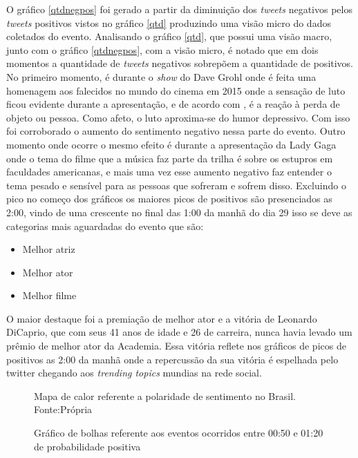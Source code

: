 O gráfico \ref{qtdnegpos} foi gerado a partir da diminuição dos \textit{tweets} negativos pelos \textit{tweets} positivos vistos no gráfico \ref{qtd} produzindo uma visão micro do dados coletados do evento. Analisando o gráfico \ref{qtd}, que possui uma visão macro, junto com o gráfico \ref{qtdnegpos}, com a visão micro, é notado que em dois momentos a quantidade de \textit{tweets} negativos sobrepõem a quantidade de positivos. No primeiro momento, é durante o \textit{show} do Dave Grohl onde é feita uma homenagem aos falecidos no mundo do cinema em 2015 onde a sensação de luto ficou evidente durante a apresentação, e de acordo com \cite{freud1908conferencias}, é a reação à perda de objeto ou pessoa. Como afeto, o luto aproxima-se do humor depressivo. Com isso foi corroborado o aumento do sentimento negativo nessa parte do evento. Outro momento onde ocorre o mesmo efeito é durante a apresentação da Lady Gaga onde o tema do filme que a  música faz parte da trilha é sobre os estupros em faculdades americanas, e mais uma vez esse aumento negativo faz entender o tema pesado e sensível para as pessoas que sofreram e sofrem disso. Excluindo o pico no começo dos gráficos os maiores picos de positivos são presenciados as 2:00, vindo de uma crescente no final das 1:00 da manhã do dia 29 isso se deve as categorias mais aguardadas do evento que são:

 \begin{itemize}
 	\item Melhor atriz
 	\item Melhor ator
 	\item Melhor filme
 \end{itemize}

O maior destaque foi a premiação de melhor ator e a vitória de Leonardo DiCaprio, que com seus 41 anos de idade e 26 de carreira, nunca havia levado um prêmio de melhor ator da Academia. Essa vitória reflete nos gráficos de picos de positivos as 2:00 da manhã onde a repercussão da sua vitória é espelhada pelo twitter chegando aos \textit{trending topics} mundias na rede social.


\begin{figure}[H]
	\centering{}
	\caption{Mapa de calor referente a polaridade de sentimento no Brasil. Fonte:Própria}
	\label{mapa}
\end{figure}

\begin{figure}[H]
	\centering{}
	\caption{Gráfico de bolhas referente aos eventos ocorridos entre 00:50 e 01:20 de probabilidade positiva}
	\label{pos1}
\end{figure}

